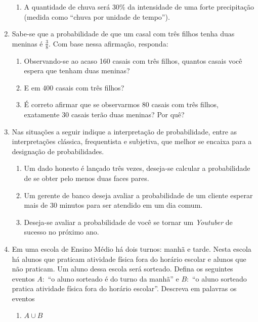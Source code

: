 \begin{enumerate}
\begin{enumerate}
\item {} 
A quantidade de chuva será 30\% da intensidade de uma forte precipitação (medida como “chuva por unidade de tempo”).

\end{enumerate}

\item Sabe-se que a probabilidade de que um casal com três filhos tenha duas meninas é \(\frac{3}{8}\). Com base nessa afirmação, responda:
\begin{enumerate}
\item {} 
Observando-se ao acaso 160 casais com três filhos, quantos casais você espera que tenham duas meninas?

\item {} 
E em 400 casais com três filhos?

\item {} 
É correto afirmar que se observarmos 80 casais com três filhos, exatamente 30 casais terão duas meninas? Por quê?

\end{enumerate}

\item Nas situações a seguir indique a interpretação de probabilidade, entre as interpretações clássica, frequentista e subjetiva, que melhor se encaixa para a designação de probabilidades.
\begin{enumerate}
\item {} 
Um dado honesto é lançado três vezes, deseja-se calcular a probabilidade de se obter pelo menos duas faces pares.

\item {} 
Um gerente de banco deseja avaliar a probabilidade de um cliente esperar mais de 30 minutos para ser atendido em um dia comum.

\item {} 
Deseja-se avaliar a probabilidade de você se tornar um \emph{Youtuber} de sucesso no próximo ano.

\end{enumerate}

\item Em uma escola de Ensino Médio há dois turnos: manhã e tarde. Nesta escola há alunos que praticam atividade física fora do horário escolar e alunos que não praticam. Um aluno dessa escola será sorteado. Defina os seguintes eventos \(A:\) “o aluno sorteado é do turno da manhã” e \(B:\) “o aluno sorteado pratica atividade física fora do horário escolar”. Descreva em palavras os eventos
\begin{enumerate}
\item {} 
\(A\cup B\)


\end{enumerate}
\end{enumerate}
